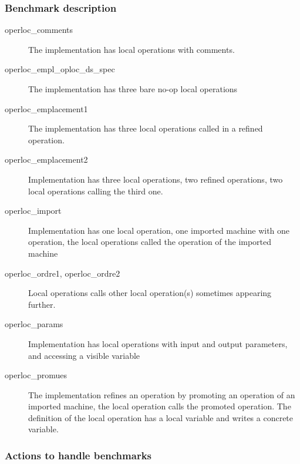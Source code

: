 \documentclass{article}
\begin{document}
\subsubsection{Benchmark description}

\begin{description} 

\item[operloc\_comments] The implementation has
local operations with comments.  

\item[operloc\_empl\_oploc\_ds\_spec] The implementation has three bare
no-op local operations

\item[operloc\_emplacement1] The implementation has three local
operations called in a refined operation.

\item[operloc\_emplacement2] Implementation has three local operations,
two refined operations, two local operations calling the third one.

\item[operloc\_import] Implementation has one local operation, one
imported machine with one operation, the local operations called the
operation of the imported machine

\item[operloc\_ordre1, operloc\_ordre2] Local operations calls other local
operation(s) sometimes appearing further.

\item[operloc\_params] Implementation has local operations with input
and output parameters, and accessing a visible variable

\item[operloc\_promues] The implementation refines an operation by
  promoting an operation of an imported machine, the local operation
  calls the promoted operation. The definition of the local operation
  has a local variable and writes a concrete variable.

\end{description}

\subsubsection{Actions to handle benchmarks}
\end{document}
